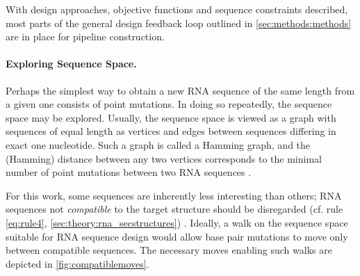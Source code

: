 \documentclass[../../master.tex]{subfiles}
\begin{document}
With design approaches, objective functions and sequence constraints described, most parts of the general design feedback loop outlined in \autoref{sec:methods:methods} are in place for pipeline construction.

\paragraph{Exploring Sequence Space.}
\label{par:methods:seqspace}

Perhaps the simplest way to obtain a new RNA sequence of the same length from a given one consists of point mutations.
In doing so repeatedly, the sequence space may be explored.
Usually, the sequence space is viewed as a graph with sequences of equal length as vertices and edges between sequences differing in exact one nucleotide.
Such a graph is called a Hamming graph, and the (Hamming) distance between any two vertices corresponds to the minimal number of point mutations between two RNA sequences \parencite{reidys_generic_1997}.

For this work, some sequences are inherently less interesting than others; RNA sequences not \emph{compatible} to the target structure should be disregarded (cf. rule \ref{eq:rule4}, \autoref{sec:theory:rna_secstructures}) \parencite{gruner_analysis_1996}.
Ideally, a walk on the sequence space suitable for RNA sequence design would allow base pair mutations to move only between compatible sequences.
The necessary moves enabling such walks are depicted in \autoref{fig:compatiblemoves}.
\end{document}
